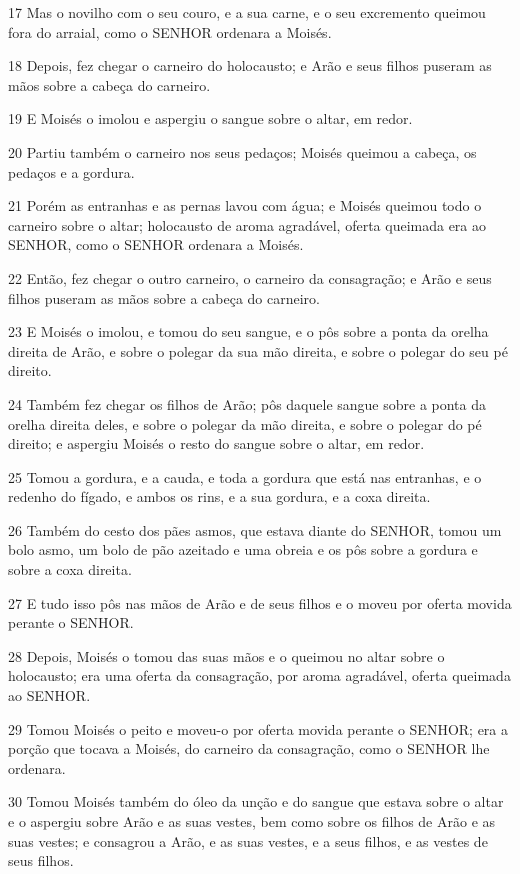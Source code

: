 \par 17 Mas o novilho com o seu couro, e a sua carne, e o seu excremento queimou fora do arraial, como o SENHOR ordenara a Moisés.
\par 18 Depois, fez chegar o carneiro do holocausto; e Arão e seus filhos puseram as mãos sobre a cabeça do carneiro.
\par 19 E Moisés o imolou e aspergiu o sangue sobre o altar, em redor.
\par 20 Partiu também o carneiro nos seus pedaços; Moisés queimou a cabeça, os pedaços e a gordura.
\par 21 Porém as entranhas e as pernas lavou com água; e Moisés queimou todo o carneiro sobre o altar; holocausto de aroma agradável, oferta queimada era ao SENHOR, como o SENHOR ordenara a Moisés.
\par 22 Então, fez chegar o outro carneiro, o carneiro da consagração; e Arão e seus filhos puseram as mãos sobre a cabeça do carneiro.
\par 23 E Moisés o imolou, e tomou do seu sangue, e o pôs sobre a ponta da orelha direita de Arão, e sobre o polegar da sua mão direita, e sobre o polegar do seu pé direito.
\par 24 Também fez chegar os filhos de Arão; pôs daquele sangue sobre a ponta da orelha direita deles, e sobre o polegar da mão direita, e sobre o polegar do pé direito; e aspergiu Moisés o resto do sangue sobre o altar, em redor.
\par 25 Tomou a gordura, e a cauda, e toda a gordura que está nas entranhas, e o redenho do fígado, e ambos os rins, e a sua gordura, e a coxa direita.
\par 26 Também do cesto dos pães asmos, que estava diante do SENHOR, tomou um bolo asmo, um bolo de pão azeitado e uma obreia e os pôs sobre a gordura e sobre a coxa direita.
\par 27 E tudo isso pôs nas mãos de Arão e de seus filhos e o moveu por oferta movida perante o SENHOR.
\par 28 Depois, Moisés o tomou das suas mãos e o queimou no altar sobre o holocausto; era uma oferta da consagração, por aroma agradável, oferta queimada ao SENHOR.
\par 29 Tomou Moisés o peito e moveu-o por oferta movida perante o SENHOR; era a porção que tocava a Moisés, do carneiro da consagração, como o SENHOR lhe ordenara.
\par 30 Tomou Moisés também do óleo da unção e do sangue que estava sobre o altar e o aspergiu sobre Arão e as suas vestes, bem como sobre os filhos de Arão e as suas vestes; e consagrou a Arão, e as suas vestes, e a seus filhos, e as vestes de seus filhos.
